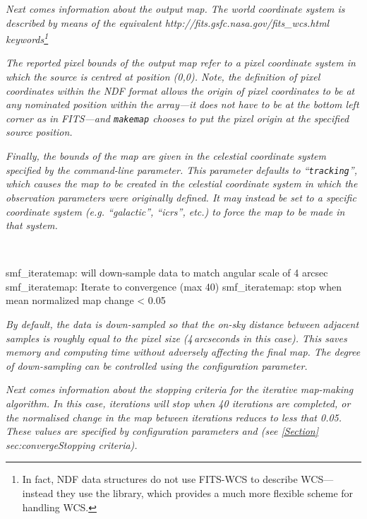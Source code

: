\emph{Next comes information about the output map. The world coordinate
system is described by means of the equivalent 
{http://fits.gsfc.nasa.gov/fits_wcs.html} keywords\footnote{In fact, NDF
data structures do not use FITS-WCS to describe WCS---instead they use the
 library, which
provides a much more flexible scheme for handling WCS.}}

\emph{The reported pixel bounds of the output map refer to a pixel coordinate
system in which the source is centred at position (0,0). Note, the definition of
pixel coordinates within the NDF format allows the origin of pixel
coordinates to be at any nominated position within the array---it does
not have to be at the bottom left corner as in FITS---and \texttt{makemap}
chooses to put the pixel origin at the specified source position. }

\emph{Finally, the bounds of the map are given in the celestial coordinate
system specified by the  command-line
parameter.  This parameter defaults to ``\texttt{tracking}'', which causes
the map to be created in the celestial coordinate system in which the
observation parameters were originally defined. It may instead be set to a
specific coordinate system (e.g. ``galactic'', ``icrs'', etc.) to force the
map to be made in that system.}

~
\begin{terminalv}
smf_iteratemap: will down-sample data to match angular scale of 4 arcsec
smf_iteratemap: Iterate to convergence (max 40)
smf_iteratemap: stop when mean normalized map change < 0.05
\end{terminalv}

\emph{By default, the data is down-sampled so that the on-sky distance between
adjacent samples is roughly equal to the pixel size (4\,arcseconds in
this case). This saves memory and computing time without adversely
affecting the final map. The degree of down-sampling can be controlled
using the  configuration parameter.}

\emph{Next comes information about the stopping criteria for the iterative
map-making algorithm. In this case, iterations will stop when 40 iterations are
completed, or the normalised change in the map between iterations reduces
to less that 0.05. These values are specified by configuration parameters
 and  (see \cref{Section}
{sec:converge}{Stopping criteria}).}

